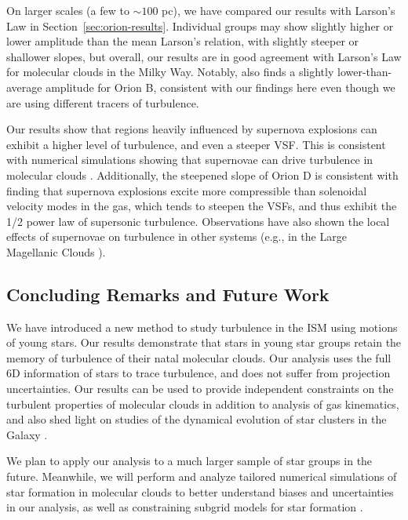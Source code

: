 On larger scales (a few to $\sim 100$ pc), we have compared our results with Larson's Law in Section~\ref{sec:orion-results}. Individual groups may show slightly higher or lower amplitude than the mean Larson's relation, with slightly steeper or shallower slopes, but overall, our results are in good agreement with Larson's Law for molecular clouds in the Milky Way. Notably, \citet{larson_turbulence_1981} also finds a slightly lower-than-average amplitude for Orion B, consistent with our findings here even though we are using different tracers of turbulence. 

Our results show that regions heavily influenced by supernova explosions can exhibit a higher level of turbulence, and even a steeper VSF\@. This is consistent with numerical simulations showing that supernovae can drive turbulence in molecular clouds \citep{padoan_supernova_2016}.
Additionally, the steepened slope of Orion D is consistent with \citet{federrath_universality_2013} finding that supernova explosions excite more compressible than solenoidal velocity modes in the gas, which tends to steepen the VSFs, and thus exhibit the 1/2 power law of supersonic turbulence. Observations have also shown the local effects of supernovae on turbulence in other systems (e.g., in the Large Magellanic Clouds \citep{szotkowski_mapping_2019}). 

\subsection{Concluding Remarks and Future Work}
We have introduced a new method to study turbulence in the ISM using motions of 
young stars. Our results demonstrate that stars in young star groups retain the memory of turbulence of their natal molecular clouds. Our analysis uses the full 6D information of stars to trace turbulence, and does not suffer from projection uncertainties. Our results can be used to provide independent constraints on the turbulent properties of molecular clouds in addition to analysis of gas kinematics, and also shed light on studies of the dynamical evolution of star clusters in the Galaxy \citep{kamdar_dynamical_2019}. 

We plan to apply our analysis to a much larger sample of star groups in the future. Meanwhile, we will perform and analyze tailored numerical simulations of star formation in molecular clouds to better understand biases and uncertainties in our analysis, as well as constraining subgrid models for star formation \citep{li_disruption_2019}. 

